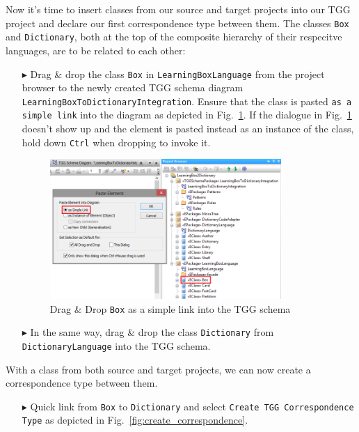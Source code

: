 Now it's time to insert classes from our source and target projects into our TGG project and declare our first correspondence type between them.
The classes \texttt{Box} and \texttt{Dictionary}, both at the top of the composite hierarchy of their respecitve languages, are to be related to each other:
\begin{enumerate}
\item[$\blacktriangleright$] Drag \& drop the class \texttt{Box} in \texttt{Learning\-Box\-Language} from the project 
browser to the newly created TGG schema diagram \texttt{Learning\-Box\-To\-Dictionary\-Integration}.
Ensure that the class is pasted \texttt{as a simple link} into the diagram as depicted in Fig.~\ref{fig:drag_drop_box}. 
If the dialogue in Fig.~\ref{fig:drag_drop_box} doesn't show up and the element is pasted instead as an instance of the class, hold down \texttt{Ctrl} when dropping to invoke it.

\begin{figure}[htbp]
\begin{center}
  \includegraphics[width=0.83\textwidth]{pics/tggBilder/tggSchema/tgg4.png}
  \caption{Drag \& Drop \texttt{Box} as a simple link into the TGG schema} 
  \label{fig:drag_drop_box}
\end{center}
\end{figure}

\item[$\blacktriangleright$] In the same way, drag \& drop the class \texttt{Dictionary} from \texttt{Dictionary\-Language} into the TGG schema. 
\end{enumerate}

With a class from both source and target projects, we can now create a correspondence type between them.
\begin{enumerate}
\item[$\blacktriangleright$] Quick link from \texttt{Box} to \texttt{Dictionary} and select \texttt{Create TGG Corres\-pon\-dence Type} as depicted in Fig.~\ref{fig:create_correspondence}.
\end{enumerate}

